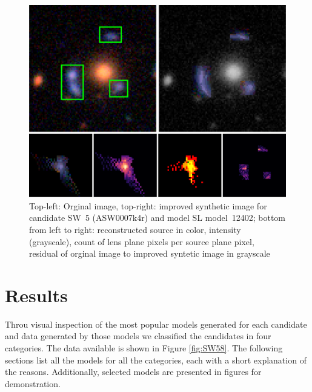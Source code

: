 \documentclass[fleqn,usenatbib]{mnras}
\newcommand{\asw}[1]{ASW000#1}
\newcommand{\sw}[1]{SW~#1}
\newcommand{\model}[1]{SL model~#1}
\newcommand{\figref}[1]{Figure \ref{fig:#1}}
\begin{document}
\begin{figure}
  \includegraphics[width=\linewidth]{img/new_synth_img_detailed}
  \caption{
      Top-left: Orginal image, top-right: improved synthetic image for candidate \sw{5} (\asw{7k4r}) and model \model{12402};
      bottom from left to right:
        reconstructed source in color,
        intensity (grayscale),
        count of lens plane pixels per source plane pixel,
        residual of orginal image to improved syntetic image in grayscale
    }
  \label{fig:synthimg}
\end{figure}






\section{Results}
Throu visual inspection of the most popular models generated for each candidate and data generated by those models we classified the candidates in four categories.
The data available is shown in \figref{SW58}.
The following sections list all the models for all the categories, each with a short explanation of the reasons.
Additionally, selected models are presented in figures for demonstration.

% 
% 
% 
% 
% 
% 
\end{document}
